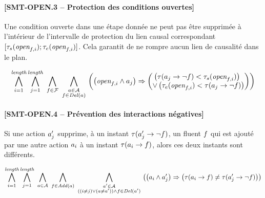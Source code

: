 \paragraph*{[SMT-OPEN.3 -- Protection des conditions ouvertes]}

Une condition ouverte dans une étape donnée ne peut pas être supprimée à l'intérieur de l'intervalle de protection du lien causal correspondant $[\tau_{s}(\textit{open}_{f,i});\tau_{e}(\textit{open}_{f,i})]$. Cela garantit de ne rompre aucun lien de causalité dans le plan.

\begin{small}
\[
\BigforallTwo{i=1}{\length}\BigforallTwo{j=1}{\length}%
~\Bigforall{\substack{\f\in \F}}~\Bigforall{\substack{\a\in \A\\\f \in \del{\a}}}\hfill\\
\left(\left(\open{\f}{i} \wedge \a_{j}\right) \Rightarrow \begin{pmatrix}\left(\tau(\a_{j}\rightarrow \neg \f) < \tau_{s}(\open{\f}{i})\right)\hfill\\
 \vee \left(\tau_{e}(\open{\f}{i}) < \tau(\a_j\rightarrow \neg \f)\right)\end{pmatrix}\right)%
\]
\end{small}


\paragraph*{[SMT-OPEN.4 -- Prévention des interactions négatives]}

Si une action $a'_{j}$ supprime, à un instant $\tau(a'_{j}\rightarrow\neg f)$, un fluent $f$ qui est ajouté par une autre action $a_{i}$ à un instant $\tau(a_{i}\rightarrow f)$, alors ces deux instants sont différents.

\begin{small}
\[
\BigforallTwo{i=1}{\length}\BigforallTwo{j=1}{\length}%
~\Bigforall{\substack{\a\in \A}}~\Bigforall{\substack{\f\in \add{\a}}}~\Bigforall{\substack{\b\in \A\\((i \neq j) \vee (\a \neq \b)) \wedge \f \in \del{\b}}}\hfill\\
\left(\left(\a_{i} \wedge \b_{j}\right) \Rightarrow %
\left(\tau(\a_{i}\rightarrow \f) \neq \tau(\b_{j}\rightarrow \neg \f)\right)%
\right)%
\]
\end{small}

